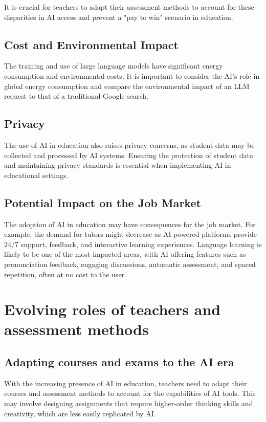 \documentclass{article}
\begin{document}
It is crucial for teachers to adapt their assessment methods to account for these disparities in AI access and prevent a "pay to win" scenario in education.

\subsection{Cost and Environmental Impact}

The training and use of large language models have significant energy consumption and environmental costs. It is important to consider the AI's role in global energy consumption and compare the environmental impact of an LLM request to that of a traditional Google search.

\subsection{Privacy}

The use of AI in education also raises privacy concerns, as student data may be collected and processed by AI systems. Ensuring the protection of student data and maintaining privacy standards is essential when implementing AI in educational settings.

\subsection{Potential Impact on the Job Market}

The adoption of AI in education may have consequences for the job market.
For example, the demand for tutors might decrease as AI-powered platforms
provide 24/7 support, feedback, and interactive learning experiences.
Language learning is likely to be one of the most impacted areas, with
AI offering features such as pronunciation feedback, engaging discussions,
automatic assessment, and spaced repetition, often at no cost to the user.


\newpage
\section{Evolving roles of teachers and assessment methods}

\subsection{Adapting courses and exams to the AI era}
With the increasing presence of AI in education, teachers need to adapt their courses and assessment methods to account for the capabilities of AI tools. This may involve designing assignments that require higher-order thinking skills and creativity, which are less easily replicated by AI.
\end{document}
